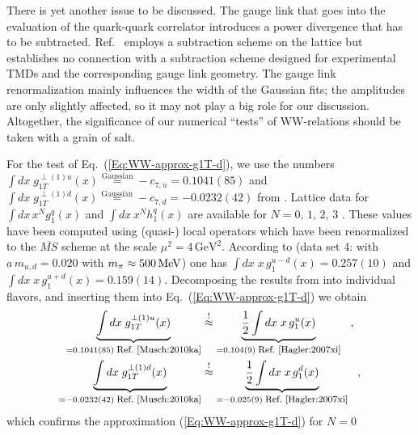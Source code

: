 \documentclass[a4paper,11pt]{article}
\newcommand{\ba}{\begin{eqnarray}}
\newcommand{\ea}{\end{eqnarray}}
\begin{document}
There is yet another issue to be discussed. 
The gauge link that goes into the evaluation of the quark-quark correlator 
introduces a power divergence that has to be subtracted. 
Ref.~\cite{Musch:2010ka} employs a subtraction scheme on the lattice
but establishes no connection with a subtraction scheme designed for experimental TMDs and 
the corresponding gauge link geometry. The gauge link renormalization mainly 
influences the width of the Gaussian fits; the amplitudes are only slightly 
affected, so it may not play a big role for our discussion. Altogether, the 
significance of our numerical ``tests'' of WW-relations should be taken 
with a grain of salt.

For the test of Eq.~(\ref{Eq:WW-approx-g1T-d}), we use the numbers 
$\int d x\;g_{1T}^{\perp(1)u}(x)\stackrel{\text{Gaussian}}{=}-c_{7,u}= 0.1041(85)$ 
and
$\int d x\;g_{1T}^{\perp(1)d}(x)\stackrel{\text{Gaussian}}{=}-c_{7,d}=-0.0232(42)$
from \cite{Musch:2010ka}. %
Lattice data for
$\int d x \,x^{N}g_1^q(x)$
\cite{Hagler:2003is,Hagler:2007xi} and
$\int d x \,x^{N}h_1^q(x)$
\cite{Gockeler:2005cj} are available for $N=0,\,1,\,2,\,3$ .
These values have been computed using (quasi-) local operators which 
have been renormalized to the $\overline{MS}$ scheme at the scale 
$\mu^2 = 4\,\text{GeV}^2$.
According to \cite{Hagler:2007xi} (data set 4:
with $a\,m_{u,d} = 0.020$ with $m_\pi\approx 500\,{\rm MeV}$)
one has $\int d x \;x\,g_1^{u-d}(x)= 0.257(10)$ and
$\int d x \;x\,g_1^{u+d}(x)= 0.159(14)$.
Decomposing the results from  \cite{Hagler:2007xi} into
individual flavors, and inserting them into
Eq.~(\ref{Eq:WW-approx-g1T-d}) we obtain
\ba
        \underbrace{\int d x\;g_{1T}^{\perp(1)u}(x)}
        _{= 0.1041(85) \;\mbox{\footnotesize Ref.~\cite{Musch:2010ka}}}
        &\stackrel{!}{\approx}
        \underbrace{\frac{1}{2}\int d x\;x\,g_1^u(x)}
        _{= 0.104(9) \;\mbox{\footnotesize Ref.~\cite{Hagler:2007xi}}}
        \hspace{3mm} , \nonumber \\
        \underbrace{\int d x\;g_{1T}^{\perp(1)d}(x)}
        _{= -0.0232(42) \;\mbox{\footnotesize Ref.~\cite{Musch:2010ka}}}
        &\stackrel{!}{\approx}
        \underbrace{\frac{1}{2}\int d x\;x\,g_1^d(x)}
        _{= -0.025(9) \;\mbox{\footnotesize Ref.~\cite{Hagler:2007xi}}}
        \hspace{3mm}, 
        \label{Eq:test-WW-type-lattice-g1T}
\ea
which confirms the approximation (\ref{Eq:WW-approx-g1T-d}) for $N=0$
\end{document}
